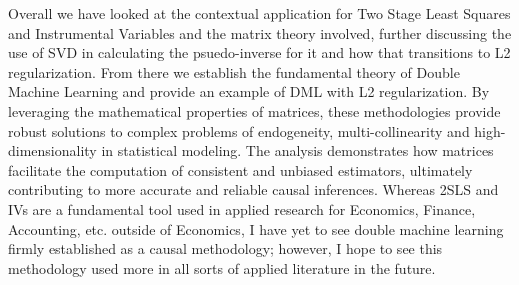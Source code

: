 Overall we have looked at the contextual application for Two Stage Least Squares and Instrumental Variables and the matrix theory involved, further discussing the use of SVD in calculating the psuedo-inverse for it and how that transitions to L2 regularization. From there we establish the fundamental theory of Double Machine Learning and provide an example of DML with L2 regularization. By leveraging the mathematical properties of matrices, these methodologies provide robust solutions to complex problems of endogeneity, multi-collinearity and high-dimensionality in statistical modeling. The analysis demonstrates how matrices facilitate the computation of consistent and unbiased estimators, ultimately contributing to more accurate and reliable causal inferences. Whereas 2SLS and IVs are a fundamental tool used in applied research for Economics, Finance, Accounting, etc. outside of Economics, I have yet to see double machine learning firmly established as a causal methodology; however, I hope to see this methodology used more in all sorts of applied literature in the future.